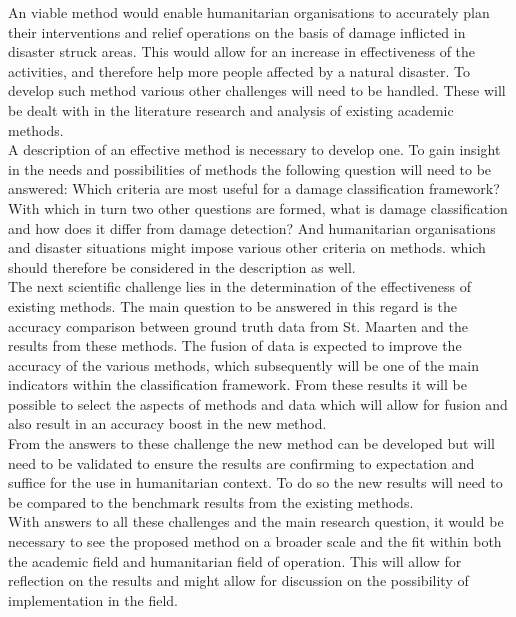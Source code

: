 An viable method would enable humanitarian organisations to accurately plan their interventions and relief operations on the basis of damage inflicted in disaster struck areas. This would allow for an increase in effectiveness of the activities, and therefore help more people affected by a natural disaster. To develop such method various other challenges will need to be handled. These will be dealt with in the literature research and analysis of existing academic methods.\\ 
A description of an effective method is necessary to develop one. To gain insight in the needs and possibilities of methods the following question will need to be answered: Which criteria are most useful for a damage classification framework? With which in turn two other questions are formed, what is damage classification and how does it differ from damage detection? And humanitarian organisations and disaster situations might impose various other criteria on methods. which should therefore be considered in the description as well.\\
The next scientific challenge lies in the determination of the effectiveness of existing methods. The main question to be answered in this regard is the accuracy comparison between ground truth data from St. Maarten and the results from these methods. The fusion of data is expected to improve the accuracy of the various methods, which subsequently will be one of the main indicators within the classification framework. From these results it will be possible to select the aspects of methods and data which will allow for fusion and also result in an accuracy boost in the new method.\\
From the answers to these challenge the new method can be developed but will need to be validated to ensure the results are confirming to expectation and suffice for the use in humanitarian context. To do so the new results will need to be compared to the benchmark results from the existing methods. \\

With answers to all these challenges and the main research question, it would be necessary to see the proposed method on a broader scale and the fit within both the academic field and humanitarian field of operation. This will allow for reflection on the results and might allow for discussion on the possibility of implementation in the field.

